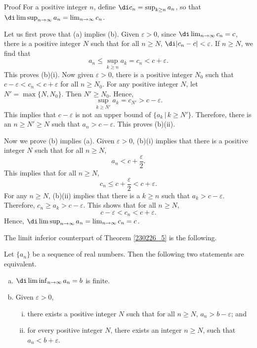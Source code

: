 \begin{myproof}{Proof}
For a positive integer $n$, define $\di c_n=\sup_{k\geq n}a_n$, so that $\di\limsup_{n\to\infty}a_n=\lim_{n\to\infty}c_n$.

Let us first prove that (a) implies (b). Given $\varepsilon>0$, since $\di\lim_{n\to\infty}c_n=c$,  there is a positive integer $N$ such that for all $n\geq N$, $
\di |c_n-c|<\varepsilon$.
If $n\geq N$, we find that
\[a_n\leq\sup_{k\geq n}a_k=c_n<c+\varepsilon.\]This proves (b)(i). Now given $\varepsilon>0$,  there is a positive integer $N_0$ such that $c-\varepsilon<c_n<c+\varepsilon$ for all $n\geq N_0$.
For any positive integer $N$, let $N'=\max\{N, N_0\}$. Then $N'\geq N_0$. Hence,
\[ \sup_{k\geq N'}a_k=c_{N'}>c-\varepsilon.\]This implies that $c-\varepsilon$ is not an upper bound of $\{a_k\,|\,k\geq N'\}$. Therefore, there is an $n\geq N'\geq N$ such that $a_n>c-\varepsilon$. This proves (b)(ii).

Now we prove (b) implies (a).  Given $\varepsilon>0$, (b)(i) implies that there is a positive integer $N$ such that for all $n\geq N$, 
\[a_n<c+\frac{\varepsilon}{2}.\]\bp
This implies that for all $n\geq N$,
\[c_n\leq c+\frac{\varepsilon}{2}<c+\varepsilon.\] 
For any $n\geq N$, (b)(ii) implies that there is a $k\geq n$ such that $a_k>c-\varepsilon$. Therefore, $c_n\geq a_k>c-\varepsilon$. This shows that for all $n\geq N$, 
\[c-\varepsilon<c_n<c+\varepsilon.\]
Hence, $\di\limsup_{n\to\infty}a_n=\lim_{n\to\infty}c_n=c$.

\end{myproof}




The limit inferior counterpart of Theorem \ref{230226_5} is the following.
\begin{theorem}[label=230226_11]{}
Let $\{a_n\}$ be a sequence of real numbers. Then  the following two statements are equivalent.
\begin{enumerate}[(a)]
\item $\di\liminf_{n\to\infty}a_n=b$ is finite.
\item Given $\varepsilon>0$, \begin{enumerate}[(i)]\item
there exists a positive integer $N$ such that for all $n\geq N$, $a_n>b-\varepsilon$; and 
\item for every 
  positive integer $N$, there exists an integer $n\geq N$, such that $a_n<b+\varepsilon$.
 \end{enumerate}\end{enumerate}
\end{theorem}

